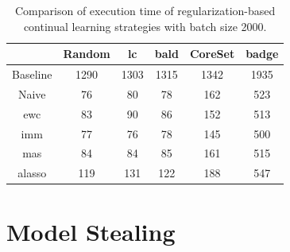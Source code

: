 \begin{table}[h]
    \centering
    \begin{tabular}{c | c c c c c } 
         & Random & \gls{lc} & \gls{bald} & CoreSet & \gls{badge}\\ 
        \hline 
        Baseline & 1290 & 1303 & 1315 & 1342 & 1935 \\
        \hline
        Naive & 76 & 80 & 78 & 162 & 523 \\
        \gls{ewc} & 83 & 90 & 86 & 152 & 513\\
        \gls{imm} & 77 & 76 & 78 & 145 & 500\\
        \gls{mas} & 84 & 84 & 85 & 161 & 515\\
        \gls{alasso} & 119 & 131 & 122 & 188 & 547\\
    \end{tabular}
    \caption{Comparison of execution time of regularization-based continual learning strategies
    with batch size 2000.}
    \label{fig:Appendix:CAL:2000bTimeTable}
\end{table}

\clearpage

\section{Model Stealing}
\label{sec:Appendix:MS}

